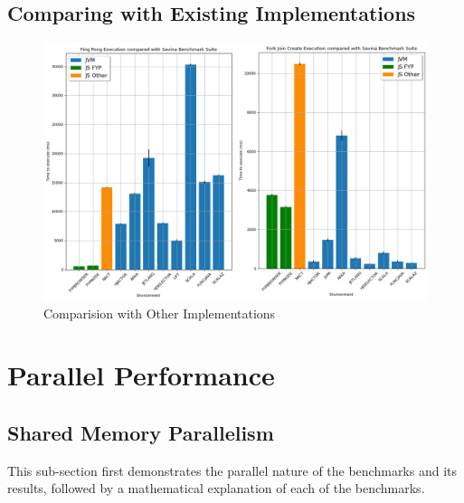 \documentclass[12pt, a4paper]{report}
\theoremstyle{definition}
\theoremstyle{definition}%
\theoremstyle{definition}%
\theoremstyle{definition}%
\theoremstyle{definition}%
\theoremstyle{definition}%
\begin{document}
\subsection{Comparing with Existing Implementations}
\begin{figure}[H]
    \begin{centering}
        \includegraphics[width=\textwidth]{resources/savina.png}
        \caption{Comparision with Other Implementations}
    \end{centering}
\end{figure}
\section{Parallel Performance}
\subsection{Shared Memory Parallelism}
This sub-section first demonstrates the parallel nature of the benchmarks and its results, followed by a mathematical explanation of each of the benchmarks.
\end{document}
